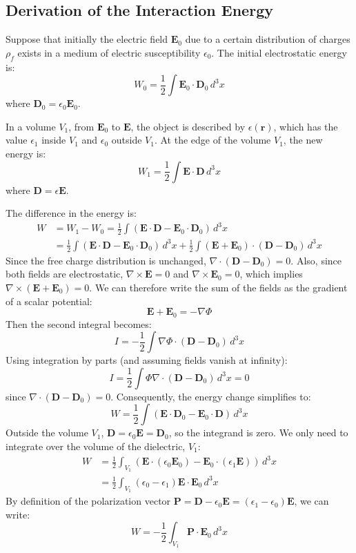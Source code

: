 \documentclass{article}
\newcommand{\vect}[1]{\mathbf{#1}}
\begin{document}
	\subsection{Derivation of the Interaction Energy}
	Suppose that initially the electric field $\vect{E}_0$ due to a certain distribution of charges $\rho_f$ exists in a medium of electric susceptibility $\epsilon_0$. The initial electrostatic energy is:
	$$
	W_0 = \frac{1}{2} \int \vect{E}_0 \cdot \vect{D}_0 \,d^3x
	$$
	where $\vect{D}_0 = \epsilon_0 \vect{E}_0$.
	
	In a volume $V_1$, from $\vect{E}_0$ to $\vect{E}$, the object is described by $\epsilon(\vect{r})$, which has the value $\epsilon_1$ inside $V_1$ and $\epsilon_0$ outside $V_1$. At the edge of the volume $V_1$, the new energy is:
	$$
	W_1 = \frac{1}{2} \int \vect{E} \cdot \vect{D} \,d^3x
	$$
	where $\vect{D} = \epsilon \vect{E}$.
	
	The difference in the energy is:
	\begin{align*}
		W &= W_1 - W_0 = \frac{1}{2} \int (\vect{E} \cdot \vect{D} - \vect{E}_0 \cdot \vect{D}_0) \,d^3x \\
		&= \frac{1}{2} \int (\vect{E} \cdot \vect{D} - \vect{E}_0 \cdot \vect{D}_0) \,d^3x + \frac{1}{2} \int (\vect{E} + \vect{E}_0) \cdot (\vect{D} - \vect{D}_0) \,d^3x
	\end{align*}
	Since the free charge distribution is unchanged, $\nabla \cdot (\vect{D} - \vect{D}_0) = 0$.
	Also, since both fields are electrostatic, $\nabla \times \vect{E} = 0$ and $\nabla \times \vect{E}_0 = 0$, which implies $\nabla \times (\vect{E} + \vect{E}_0) = 0$. We can therefore write the sum of the fields as the gradient of a scalar potential:
	$$
	\vect{E} + \vect{E}_0 = -\nabla \Phi
	$$
	Then the second integral becomes:
	$$
	I = -\frac{1}{2} \int \nabla\Phi \cdot (\vect{D} - \vect{D}_0) \,d^3x
	$$
	Using integration by parts (and assuming fields vanish at infinity):
	$$
	I = \frac{1}{2} \int \Phi \nabla \cdot (\vect{D} - \vect{D}_0) \,d^3x = 0
	$$
	since $\nabla \cdot (\vect{D} - \vect{D}_0) = 0$.
	Consequently, the energy change simplifies to:
	$$
	W = \frac{1}{2} \int (\vect{E} \cdot \vect{D}_0 - \vect{E}_0 \cdot \vect{D}) \,d^3x
	$$
	Outside the volume $V_1$, $\vect{D} = \epsilon_0 \vect{E} = \vect{D}_0$, so the integrand is zero. We only need to integrate over the volume of the dielectric, $V_1$:
	\begin{align*}
		W &= \frac{1}{2} \int_{V_1} (\vect{E} \cdot (\epsilon_0 \vect{E}_0) - \vect{E}_0 \cdot (\epsilon_1 \vect{E})) \,d^3x \\
		&= \frac{1}{2} \int_{V_1} (\epsilon_0 - \epsilon_1) \vect{E} \cdot \vect{E}_0 \,d^3x
	\end{align*}
	By definition of the polarization vector $\vect{P} = \vect{D} - \epsilon_0 \vect{E} = (\epsilon_1 - \epsilon_0)\vect{E}$, we can write:
	$$
	W = -\frac{1}{2} \int_{V_1} \vect{P} \cdot \vect{E}_0 \,d^3x
	$$
	
\end{document}
